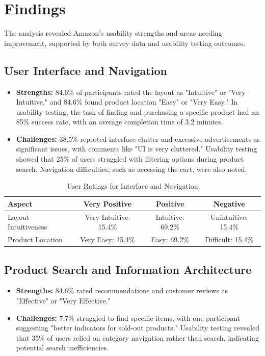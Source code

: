 \documentclass[conference]{IEEEtran}
\begin{document}
\section{Findings}
The analysis revealed Amazon's usability strengths and areas needing improvement, supported by both survey data and usability testing outcomes.

\subsection{User Interface and Navigation}
\begin{itemize}
    \item \textbf{Strengths:} 84.6\% of participants rated the layout as "Intuitive" or "Very Intuitive," and 84.6\% found product location "Easy" or "Very Easy." In usability testing, the task of finding and purchasing a specific product had an 85\% success rate, with an average completion time of 3.2 minutes.
    \item \textbf{Challenges:} 38.5\% reported interface clutter and excessive advertisements as significant issues, with comments like "UI is very cluttered." Usability testing showed that 25\% of users struggled with filtering options during product search. Navigation difficulties, such as accessing the cart, were also noted.
\end{itemize}

\begin{table}[!htbp]
\caption{User Ratings for Interface and Navigation}
\label{table:ui_navigation}
\centering
\begin{tabular}{@{}lccc@{}}
\toprule
\textbf{Aspect} & \textbf{Very Positive} & \textbf{Positive} & \textbf{Negative} \\
\midrule
Layout Intuitiveness & Very Intuitive: 15.4\% & Intuitive: 69.2\% & Unintuitive: 15.4\% \\
Product Location & Very Easy: 15.4\% & Easy: 69.2\% & Difficult: 15.4\% \\
\bottomrule
\end{tabular}
\end{table}

\subsection{Product Search and Information Architecture}
\begin{itemize}
    \item \textbf{Strengths:} 84.6\% rated recommendations and customer reviews as "Effective" or "Very Effective."
    \item \textbf{Challenges:} 7.7\% struggled to find specific items, with one participant suggesting "better indicators for sold-out products." Usability testing revealed that 35\% of users relied on category navigation rather than search, indicating potential search inefficiencies.
\end{itemize}
\end{document}
